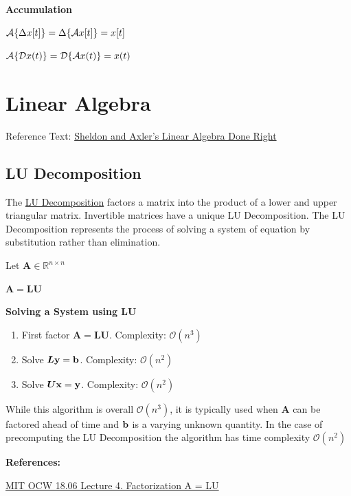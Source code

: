 \documentclass[11pt]{article}
\begin{document}
  \textbf{Accumulation}

  \(\mathcal{A}{\left\{ \Delta x[t] \right\}} = \Delta{\left\{ \mathcal{A} x[t] \right\}} = x[t]\)

  \(\mathcal{A}{\left\{ \mathcal{D} x(t) \right\}} = \mathcal{D}{\left\{ \mathcal{A} x(t) \right\}} = x(t)\)

  \pagebreak

  \section{Linear Algebra}

  Reference Text:
  \href{https://archive.org/details/SheldonAxlerAuth.LinearAlgebraDoneRight}{Sheldon and Axler's Linear Algebra Done Right}

  \subsection{LU Decomposition}

  The \href{https://www.wikiwand.com/en/LU_decomposition}{LU Decomposition} factors a matrix into the product of a
  lower and upper triangular matrix. Invertible matrices have a
  unique LU Decomposition. The LU Decomposition represents the process of solving a system
  of equation by substitution rather than elimination.

  Let \(\bm{A} \in \mathbb{R}^{n \times n}\)

  \(\bm{A} = \bm{L}\bm{U}\)

  \textbf{Solving a System using LU}


  \begin{enumerate}
    \item  First factor \(\bm{A} = \bm{L}\bm{U}\). Complexity: \(\mathcal{O}(n^3)\)
    \item  Solve \(\bm{L}\mathbf{y} = \mathbf{b}\). Complexity: \(\mathcal{O}(n^2)\)
    \item  Solve \(\bm{U}\mathbf{x} = \mathbf{y}\). Complexity: \(\mathcal{O}(n^2)\)
  \end{enumerate}

  While this algorithm is overall \(\mathcal{O}(n^3)\), it is typically used when \(\bm{A}\) can be factored
  ahead of time and \(\mathbf{b}\) is a varying unknown quantity. In the case of precomputing
  the LU Decomposition the algorithm has time complexity \(\mathcal{O}(n^2)\)

  \textbf{References:}

  \href{https://www.youtube.com/watch?v=MsIvs_6vC38}{MIT OCW 18.06 Lecture 4. Factorization A = LU}
\end{document}
